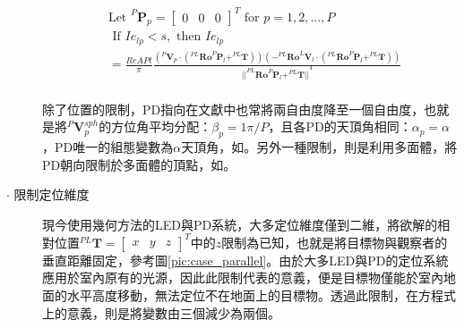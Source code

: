 \begin{description}
            \begin{equation}
                \label{eqn:model_config_restrict}
                \begin{aligned}
                    &\text{Let }
                    ^P\boldsymbol{P}_p=
                    \left[\begin{array}{ccc}0&0&0\end{array}\right]^T
                    \text{ for } p = 1,2,...,P\\
                    &\text { If } Ie_{lp}<s ,\text{ then }Ie_{lp} \\
                        &= \frac{ReAPt}{ \pi}
                    \frac{
                            {( ^{P}\boldsymbol{V}_p \cdot 
                                (
                                    ^{PL} \boldsymbol{Ro}^{P}\boldsymbol{P}_l
                                    + ^{PL}\boldsymbol{T}
                                )
                            )}
                    {
                                (
                                    -^{PL}\boldsymbol{Ro}^{L}\boldsymbol{V}_l 
                                    \cdot 
                                    (
                                        ^{PL}\boldsymbol{Ro}^{P}\boldsymbol{P}_l
                                        +^{PL}\boldsymbol{T}
                                    )
                                )
                            } } 
                        {
                            {
                                ||
                                    ^{PL}\boldsymbol{Ro}^{P}\boldsymbol{P}_l+^{PL}\boldsymbol{T}
                                ||
                            }^{4}
                        }\\
                \end{aligned}
            \end{equation}

            \qquad
            除了位置的限制，PD指向在文獻中也常將兩自由度降至一個自由度，也就是將$^P\boldsymbol{V}_p^{sph}$的方位角平均分配：$\beta_p = 1\pi/P$，且各PD的天頂角相同：$\alpha_p = \alpha$，PD唯一的組態變數為$\alpha$天頂角，如\cite{case:cart2d}\cite{case:cart3d}\cite{case:3d_layers}。另外一種限制，則是利用多面體，將PD朝向限制於多面體的頂點，如\cite{case:ml}。

            \item[$\cdot$ 限制定位維度]\hfill
            
            \qquad 
            現今使用幾何方法的LED與PD系統，大多定位維度僅到二維\cite{survey_light2018}，將欲解的相對位置$^{PL}\boldsymbol{T}=\left[\begin{array}{ccc}x&y&z\end{array}\right]^T$中的$z$限制為已知，也就是將目標物與觀察者的垂直距離固定，參考圖\ref{pic:case_parallel}。由於大多LED與PD的定位系統應用於室內原有的光源，因此此限制代表的意義，便是目標物僅能於室內地面的水平高度移動，無法定位不在地面上的目標物。透過此限制，在方程式上的意義，則是將變數由三個減少為兩個。


\end{description}
